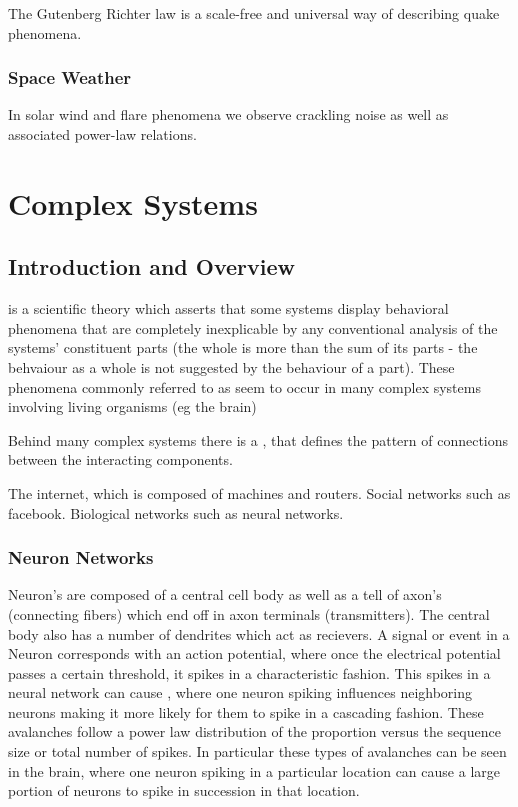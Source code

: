\documentclass[12pt, a4paper, oneside, openright, titlepage]{book}
\begin{document}
The Gutenberg Richter law is a scale-free and universal way of describing quake phenomena. 

\subsection{Space Weather}

In solar wind and flare phenomena we observe crackling noise as well as associated power-law relations.


\chapter{Complex Systems}


\section{Introduction and Overview}

\begin{defn}
     is a scientific theory which asserts that some systems display behavioral phenomena that are completely inexplicable by any conventional analysis of the systems' constituent parts (the whole is more than the sum of its parts - the behvaiour as a whole is not suggested by the behaviour of a part). These phenomena commonly referred to as  seem to occur in many complex systems involving living organisms (eg the brain)
\end{defn}

\begin{rmk}
    Behind many complex systems there is a , that defines the pattern of connections between the interacting components.
\end{rmk}

\begin{eg}
    The internet, which is composed of machines and routers. Social networks such as facebook. Biological networks such as neural networks.
\end{eg}

\subsection{Neuron Networks}

Neuron's are composed of a central cell body as well as a tell of axon's (connecting fibers) which end off in axon terminals (transmitters). The central body also has a number of dendrites which act as recievers. A signal or event in a Neuron corresponds with an action potential, where once the electrical potential passes a certain threshold, it spikes in a characteristic fashion. This spikes in a neural network can cause , where one neuron spiking influences neighboring neurons making it more likely for them to spike in a cascading fashion. These avalanches follow a power law distribution of the proportion versus the sequence size or total number of spikes. In particular these types of avalanches can be seen in the brain, where one neuron spiking in a particular location can cause a large portion of neurons to spike in succession in that location.
\end{document}

